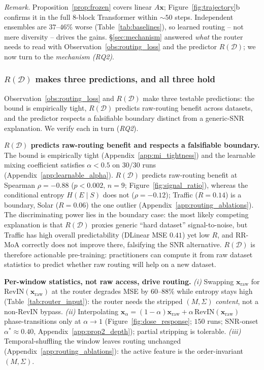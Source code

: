 \documentclass{article}
\begin{document}
{ \textit{Remark.} Proposition~\ref{prop:frozen} covers linear $A\mathbf{x}$; Figure~\ref{fig:trajectory}b confirms it in the full 8-block Transformer within ${\sim}50$ steps. Independent ensembles are $37$--$46\%$ worse (Table~\ref{tab:baselines}), so learned routing -- not mere diversity -- drives the gains. \S\ref{sec:mechanism} answered \emph{what} the router needs to read with Observation~\ref{obs:routing_loss} and the predictor $R(\mathcal{D})$; we now turn to the \emph{mechanism (RQ2)}.}

\subsubsection*{$R(\mathcal{D})$ makes three predictions, and all three hold}

Observation~\ref{obs:routing_loss} and $R(\mathcal{D})$ make three testable predictions: the bound is empirically tight, $R(\mathcal{D})$ predicts raw-routing benefit across datasets, and the predictor respects a falsifiable boundary distinct from a generic-SNR explanation. We verify each in turn (\emph{RQ2}).

\textbf{$R(\mathcal{D})$ predicts raw-routing benefit and respects a falsifiable boundary.} The bound is empirically tight (Appendix~\ref{app:mi_tightness}) and the learnable mixing coefficient satisfies $\alpha{<}0.5$ on $30/30$ runs (Appendix~\ref{app:learnable_alpha}). $R(\mathcal{D})$ predicts raw-routing benefit at Spearman $\rho{=}{-}0.88$ ($p{<}0.002$, $n{=}9$; Figure~\ref{fig:signal_ratio}), whereas the conditional entropy $H(E\mid S)$ does not ($\rho{=}{-}0.12$); Traffic ($R{=}0.14$) is a boundary, Solar ($R{=}0.06$) the one outlier (Appendix~\ref{app:routing_ablations}). The discriminating power lies in the boundary case: the most likely competing explanation is that $R(\mathcal{D})$ proxies generic ``hard dataset'' signal-to-noise, but Traffic has high overall predictability (DLinear MSE $0.41$) yet low $R$, and RR-MoA correctly does not improve there, falsifying the SNR alternative. $R(\mathcal{D})$ is therefore actionable pre-training: practitioners can compute it from raw dataset statistics to predict whether raw routing will help on a new dataset.

{ \textbf{Per-window statistics, not raw access, drive routing.} \emph{(i)} Swapping $\mathbf{x}_\text{raw}$ for $\text{RevIN}(\mathbf{x}_\text{raw})$ at the router degrades MSE by $60$--$88\%$ while entropy stays high (Table~\ref{tab:router_input}): the router needs the stripped $(M,\Sigma)$ \emph{content}, not a non-RevIN bypass. \emph{(ii)} Interpolating $\mathbf{x}_\alpha = (1{-}\alpha)\mathbf{x}_\text{raw} + \alpha\,\text{RevIN}(\mathbf{x}_\text{raw})$ phase-transitions only at $\alpha{\to}1$ (Figure~\ref{fig:dose_response}; $150$ runs; SNR-onset $\alpha^*{\approx}0.40$, Appendix~\ref{app:prop2_depth}); partial stripping is tolerable. \emph{(iii)} Temporal-shuffling the window leaves routing unchanged (Appendix~\ref{app:routing_ablations}): the active feature is the order-invariant $(M,\Sigma)$.}
\end{document}
